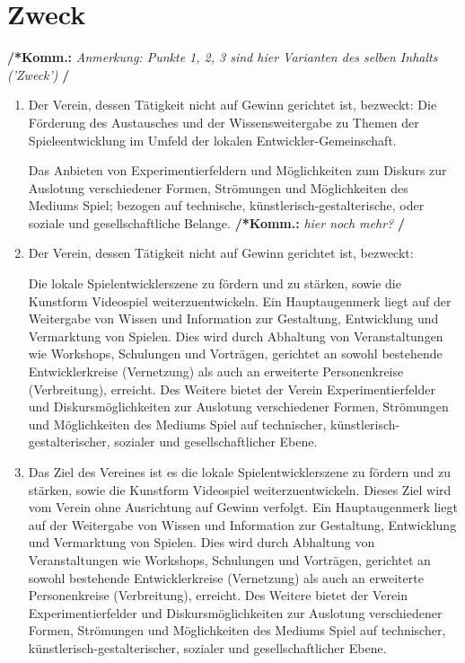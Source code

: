 \documentclass[a4paper,12pt]{article}
\newcommand{\comment}[1]{{\bf /*Komm.:} \textit{#1} {\bf */}}
\begin{document}
\section{Zweck} %
\label{sec:Zweck}
\comment{Anmerkung: Punkte 1, 2, 3 sind hier Varianten des selben Inhalts ('Zweck')}
\begin{enumerate}

\item Der Verein, dessen Tätigkeit nicht auf Gewinn gerichtet ist, bezweckt:
Die Förderung des Austausches und der Wissensweitergabe zu Themen der Spieleentwicklung im Umfeld der lokalen Entwickler-Gemeinschaft.

Das Anbieten von Experimentierfeldern und Möglichkeiten zum Diskurs zur Auslotung verschiedener Formen, Strömungen und Möglichkeiten des Mediums Spiel; bezogen auf technische, künstlerisch-gestalterische, oder soziale und gesellschaftliche Belange. \comment{hier noch mehr?}

\item Der Verein, dessen T\"atigkeit nicht auf Gewinn gerichtet ist, bezweckt:

Die lokale Spielentwicklerszene zu fördern und zu stärken, sowie die Kunstform Videospiel weiterzuentwickeln.
Ein Hauptaugenmerk liegt auf der Weitergabe von Wissen und Information zur Gestaltung, Entwicklung und Vermarktung von Spielen. Dies wird durch Abhaltung von Veranstaltungen wie Workshops,
Schulungen und Vorträgen, gerichtet an sowohl bestehende Entwicklerkreise (Vernetzung) als auch an erweiterte Personenkreise (Verbreitung), erreicht.
Des Weitere bietet der Verein Experimentierfelder und Diskursmöglichkeiten zur Auslotung verschiedener Formen, Strömungen und Möglichkeiten des Mediums Spiel auf technischer, künstlerisch-gestalterischer, sozialer und gesellschaftlicher Ebene.

\item Das Ziel des Vereines ist es die lokale Spielentwicklerszene zu fördern und zu stärken, sowie die Kunstform Videospiel weiterzuentwickeln. Dieses Ziel wird vom Verein ohne Ausrichtung auf Gewinn verfolgt.
Ein Hauptaugenmerk liegt auf der Weitergabe von Wissen und Information zur Gestaltung, Entwicklung und Vermarktung von Spielen. Dies wird durch Abhaltung von Veranstaltungen wie Workshops,
Schulungen und Vorträgen, gerichtet an sowohl bestehende Entwicklerkreise (Vernetzung) als auch an erweiterte Personenkreise (Verbreitung), erreicht.
Des Weitere bietet der Verein Experimentierfelder und Diskursmöglichkeiten zur Auslotung verschiedener Formen, Strömungen und Möglichkeiten des Mediums Spiel auf technischer, künstlerisch-gestalterischer, sozialer und gesellschaftlicher Ebene.

\end{enumerate}
\end{document}
